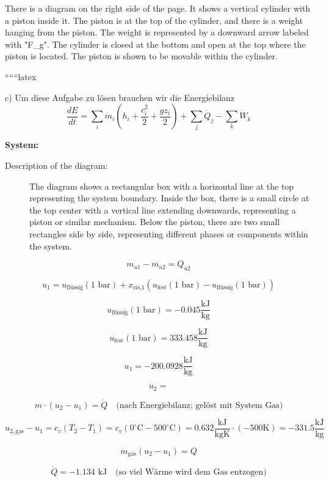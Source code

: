 There is a diagram on the right side of the page. It shows a vertical cylinder with a piston inside it. The piston is at the top of the cylinder, and there is a weight hanging from the piston. The weight is represented by a downward arrow labeled with "F_g". The cylinder is closed at the bottom and open at the top where the piston is located. The piston is shown to be movable within the cylinder.

``````latex


c) Um diese Aufgabe zu lösen brauchen wir die Energiebilanz
\[
\frac{dE}{dt} = \sum_i \dot{m}_i \left( h_i + \frac{c_i^2}{2} + \frac{g z_i}{2} \right) + \sum_j \dot{Q}_j - \sum_k \dot{W}_k
\]

\textbf{System:}

\begin{description}
    \item[Description of the diagram:] The diagram shows a rectangular box with a horizontal line at the top representing the system boundary. Inside the box, there is a small circle at the top center with a vertical line extending downwards, representing a piston or similar mechanism. Below the piston, there are two small rectangles side by side, representing different phases or components within the system.
\end{description}

\[
m_{u1} - m_{u2} = Q_{u2}
\]

\[
u_1 = u_{\text{flüssig}} (1 \text{ bar}) + x_{\text{eis,1}} \left( u_{\text{fest}} (1 \text{ bar}) - u_{\text{flüssig}} (1 \text{ bar}) \right)
\]

\[
u_{\text{flüssig}} (1 \text{ bar}) = -0.045 \frac{\text{kJ}}{\text{kg}}
\]

\[
u_{\text{fest}} (1 \text{ bar}) = 333.458 \frac{\text{kJ}}{\text{kg}}
\]

\[
u_1 = -200.0928 \frac{\text{kJ}}{\text{kg}}
\]

\[
u_2 = 
\]

\[
m \cdot (u_2 - u_1) = \dot{Q} \quad \text{(nach Energiebilanz; gelöst mit System Gas)}
\]

\[
u_{2,\text{gas}} - u_1 = c_v (T_2 - T_1) = c_v (0^\circ \text{C} - 500^\circ \text{C}) = 0.632 \frac{\text{kJ}}{\text{kgK}} \cdot (-500 \text{K}) = -331.5 \frac{\text{kJ}}{\text{kg}}
\]

\[
\dot{m}_{\text{gas}} (u_2 - u_1) = Q
\]

\[
\dot{Q} = -1.134 \text{ kJ} \quad \text{(so viel Wärme wird dem Gas entzogen)}
\]

